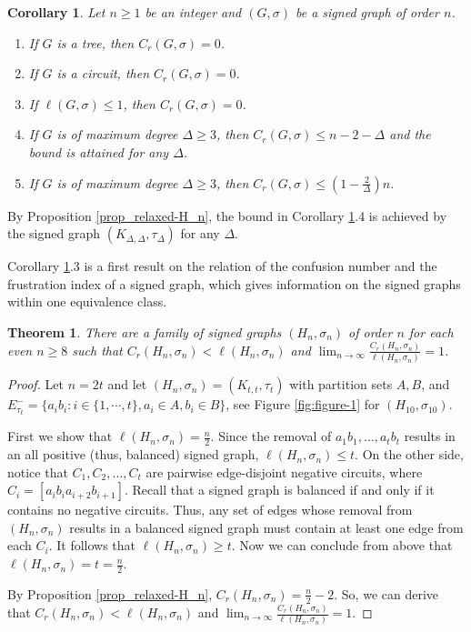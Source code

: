 \documentclass[a4paper,11pt]{article}
\newtheorem{theo}[defi]{Theorem}
\newtheorem{cor}[defi]{Corollary}
\theoremstyle{remark}
\begin{document}
\begin{cor} \label{Cor: transfer strong - relaxed}
    Let $n \geq 1$ be an integer and $(G,\sigma)$ be a signed graph of order $n$.
    \begin{enumerate}
        \item If $G$ is a tree, then $C_r(G,\sigma) = 0$.
        \item If $G$ is a circuit, then $C_r(G,\sigma) = 0$.
        \item If $\ell (G,\sigma) \leq 1$, then $C_r(G,\sigma) = 0$.
        \item If $G$ is of maximum degree $\Delta \geq 3$, then $C_r(G,\sigma) \leq n - 2 - \Delta$ and the bound is attained for 
    any $\Delta$.
        \item If $G$ is of maximum degree $\Delta \geq 3$, then $C_r(G,\sigma)\leq (1-\frac{2}{\Delta})n$.
    \end{enumerate}
\end{cor}

By Proposition \ref{prop_relaxed-H_n}, the bound in Corollary \ref{Cor: transfer strong - relaxed}.4 is achieved by the signed graph $(K_{\Delta,\Delta},\tau_\Delta)$ for any $\Delta$.

Corollary \ref{Cor: transfer strong - relaxed}.3 is a first result on the relation of 
the confusion number and the frustration index of a signed graph, which gives information
on the signed graphs within one equivalence class. 


\begin{theo} \label{Prop: 2nd bound with frustration}
There are a family of signed graphs $(H_n,\sigma_n)$ of order $n$ for each even $n\geq 8$ such that 
$C_r(H_n,\sigma_n) < \ell(H_n,\sigma_n)$ 
and 
$\lim_{n \rightarrow \infty} \frac{C_r(H_n,\sigma_n)}{\ell(H_n,\sigma_n)} = 1$.   
\end{theo}

\begin{proof}
Let $n=2t$ and let $(H_n,\sigma_n)=(K_{t,t},\tau_t)$ with partition sets $A, B$, 
and $E^-_{\tau_t} = \{a_ib_i \colon i \in \{1, \cdots ,t\}, a_i \in A, b_i \in B \}$, see Figure \ref{fig:figure-1} for $(H_{10},\sigma_{10})$.

First we show that $\ell(H_n,\sigma_n)=\frac{n}{2}$. 
Since the removal of $a_1b_1,\ldots, a_tb_t$ results in an all positive (thus, balanced) signed graph, $\ell(H_n,\sigma_n)\leq t$. 
On the other side, notice that $C_1,C_2,\ldots,C_t$ are pairwise edge-disjoint negative circuits, where $C_i=[a_ib_ia_{i+2}b_{i+1}]$. 
Recall that a signed graph is balanced if and only if it contains no negative circuits.
Thus, any set of edges whose removal from $(H_n,\sigma_n)$ results in a balanced signed graph must contain at least one edge from each $C_i$. It follows that $\ell(H_n,\sigma_n)\geq t$.
Now we can conclude from above that $\ell(H_n,\sigma_n)=t=\frac{n}{2}$.

By Proposition \ref{prop_relaxed-H_n}, $C_r(H_n,\sigma_n) =  \frac{n}{2}-2$.
So, we can derive that $C_r(H_n,\sigma_n) < \ell(H_n,\sigma_n)$ 
and 
$\lim_{n \rightarrow \infty} \frac{C_r(H_n,\sigma_n)}{\ell(H_n,\sigma_n)} = 1$.
\end{proof}
\end{document}
